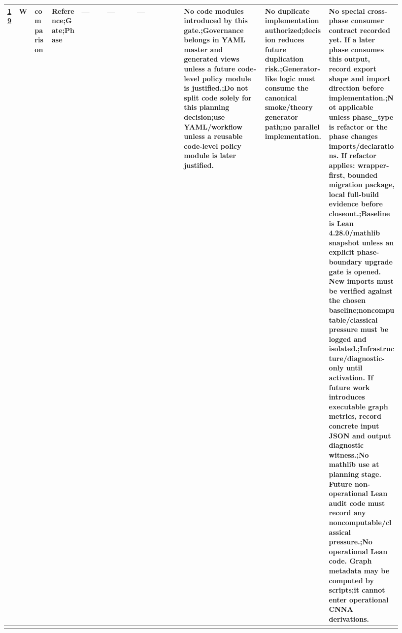 \begin{longtable}{L{0.026\linewidth} L{0.024\linewidth} L{0.045\linewidth} L{0.07\linewidth} L{0.065\linewidth} L{0.075\linewidth} L{0.11\linewidth} L{0.19\linewidth} L{0.155\linewidth} L{0.17\linewidth}}
\hyperlink{phase-row-19}{19} & W & comparison & Reference;\newline Gate;\newline Phase & --- & --- & --- & No code modules introduced by this gate.;\newline Governance belongs in YAML master and generated views unless a future code-level policy module is justified.;\newline Do not split code solely for this planning decision;\newline use YAML/\allowbreak{}workflow unless a reusable code-level policy module is later justified. & No duplicate implementation authorized;\newline decision reduces future duplication risk.;\newline Generator-like logic must consume the canonical smoke/\allowbreak{}theory generator path;\newline no parallel implementation. & No special cross-phase consumer contract recorded yet. If a later phase consumes this output, record export shape and import direction before implementation.;\newline Not applicable unless phase\_type is refactor or the phase changes imports/\allowbreak{}declarations. If refactor applies: wrapper-first, bounded migration package, local full-build evidence before closeout.;\newline Baseline is Lean 4.28.0/\allowbreak{}mathlib snapshot unless an explicit phase-boundary upgrade gate is opened. New imports must be verified against the chosen baseline;\newline noncomputable/\allowbreak{}classical pressure must be logged and isolated.;\newline Infrastructure/\allowbreak{}diagnostic-only until activation. If future work introduces executable graph metrics, record concrete input JSON and output diagnostic witness.;\newline No mathlib use at planning stage. Future non-operational Lean audit code must record any noncomputable/\allowbreak{}classical pressure.;\newline No operational Lean code. Graph metadata may be computed by scripts;\newline it cannot enter operational CNNA derivations.\\
\hline
\addlinespace[0.24em]

\end{longtable}
